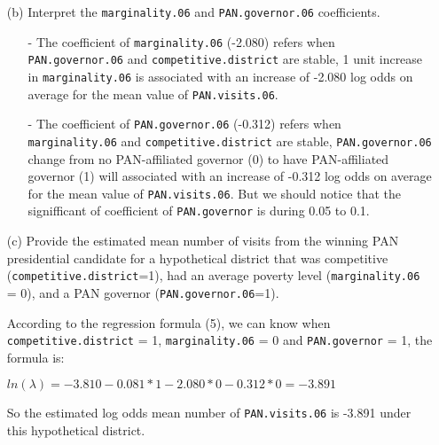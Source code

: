 \documentclass[12pt]{article} %
\begin{document}
\begin{enumerate}
\newpage
	\item [(b)]
	Interpret the \texttt{marginality.06} and \texttt{PAN.governor.06} coefficients.
\begin{itemize}
	\item[-] The coefficient of \texttt{marginality.06} (-2.080) refers when \texttt{PAN.governor.06} and \texttt{competitive.district} are stable, 1 unit increase in \texttt{marginality.06} is associated with an increase of -2.080 log odds on average for the mean value of \texttt{PAN.visits.06}.
	\item[-] The coefficient of \texttt{PAN.governor.06} (-0.312) refers when \texttt{marginality.06} and \texttt{competitive.district} are stable, \texttt{PAN.governor.06} change from no PAN-affiliated governor (0) to have PAN-affiliated governor (1) will associated with an increase of -0.312 log odds on average for the mean value of \texttt{PAN.visits.06}. But we should notice that the signifficant of coefficient of \texttt{PAN.governor} is during 0.05 to 0.1.
\end{itemize}

	\item [(c)]
	Provide the estimated mean number of visits from the winning PAN presidential candidate for a hypothetical district that was competitive (\texttt{competitive.district}=1), had an average poverty level (\texttt{marginality.06} = 0), and a PAN governor (\texttt{PAN.governor.06}=1).
	
\noindent According to the regression formula (5), we can know when \texttt{competitive.district} = 1, \texttt{marginality.06} = 0 and \texttt{PAN.governor} = 1, the formula is:
\par
$ln(\lambda) = -3.810 - 0.081 * 1 - 2.080 * 0 - 0.312 * 0 = -3.891$
\par
So the estimated log odds mean number of \texttt{PAN.visits.06} is -3.891 under this hypothetical district.
\end{enumerate}
\end{document}
